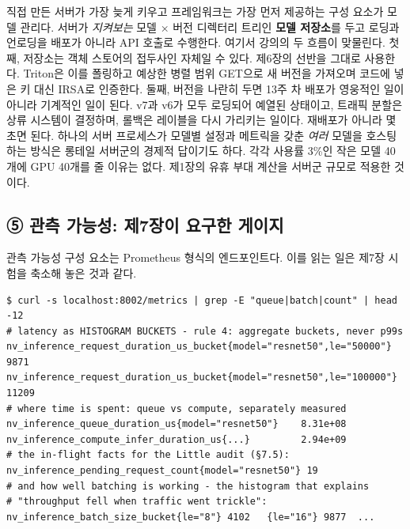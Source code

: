 직접 만든 서버가 가장 늦게 키우고 프레임워크는 가장 먼저 제공하는 구성 요소가 모델 관리다. 서버가 \textit{지켜보는} 모델 × 버전 디렉터리 트리인 \textbf{모델 저장소}를 두고 로딩과 언로딩을 배포가 아니라 API 호출로 수행한다. 여기서 강의의 두 흐름이 맞물린다. 첫째, 저장소는 객체 스토어의 접두사인  자체일 수 있다. 제6장의 선반을 그대로 사용한다. Triton은 이를 폴링하고 예상한 병렬 범위 GET으로 새 버전을 가져오며 코드에 넣은 키 대신 IRSA로 인증한다. 둘째, 버전을 나란히 두면 13주 차 배포가 영웅적인 일이 아니라 기계적인 일이 된다. v7과 v6가 모두 로딩되어 예열된 상태이고, 트래픽 분할은 상류 시스템이 결정하며, 롤백은 레이블을 다시 가리키는 일이다. 재배포가 아니라 몇 초면 된다. 하나의 서버 프로세스가 모델별 설정과 메트릭을 갖춘 \textit{여러} 모델을 호스팅하는 방식은 롱테일 서버군의 경제적 답이기도 하다. 각각 사용률 3\%인 작은 모델 40개에 GPU 40개를 줄 이유는 없다. 제1장의 유휴 부대 계산을 서버군 규모로 적용한 것이다.

\subsection*{⑤ 관측 가능성: 제7장이 요구한 게이지}

관측 가능성 구성 요소는 Prometheus 형식의  엔드포인트다. 이를 읽는 일은 제7장 시험을 축소해 놓은 것과 같다.

\begin{terminalbox}
\begin{Verbatim}[breaklines=true,breakanywhere=true,fontsize=\small,formatcom=\color{tbbtermfg},codes=\tbbcodeactive]
$ curl -s localhost:8002/metrics | grep -E "queue|batch|count" | head -12
# latency as HISTOGRAM BUCKETS - rule 4: aggregate buckets, never p99s
nv_inference_request_duration_us_bucket{model="resnet50",le="50000"} 9871
nv_inference_request_duration_us_bucket{model="resnet50",le="100000"} 11209
# where time is spent: queue vs compute, separately measured
nv_inference_queue_duration_us{model="resnet50"}    8.31e+08
nv_inference_compute_infer_duration_us{...}         2.94e+09
# the in-flight facts for the Little audit (§7.5):
nv_inference_pending_request_count{model="resnet50"} 19
# and how well batching is working - the histogram that explains
# "throughput fell when traffic went trickle":
nv_inference_batch_size_bucket{le="8"} 4102   {le="16"} 9877  ...
\end{Verbatim}
\end{terminalbox}

